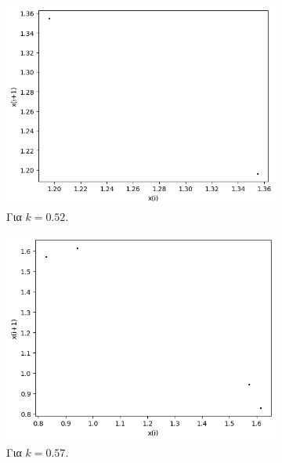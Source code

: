 \begin{figure}[h!]
\begin{subfigure}[b]{0.4\textwidth}
		\centering
		\includegraphics[width=\textwidth]{LateX images/graphs q07/g5}
		\caption{Για $k=0.52$.}
		\label{f:k39}
	\end{subfigure}
	\hfill
	\begin{subfigure}[b]{0.4\textwidth}
		\centering
		\includegraphics[width=\textwidth]{LateX images/graphs q07/g6}
		\caption{Για $k=0.57$.}
		\label{f:k40}
	\end{subfigure}
	\hfill
	\begin{subfigure}[b]{0.4\textwidth}
		\centering

\end{subfigure}
\end{figure}
